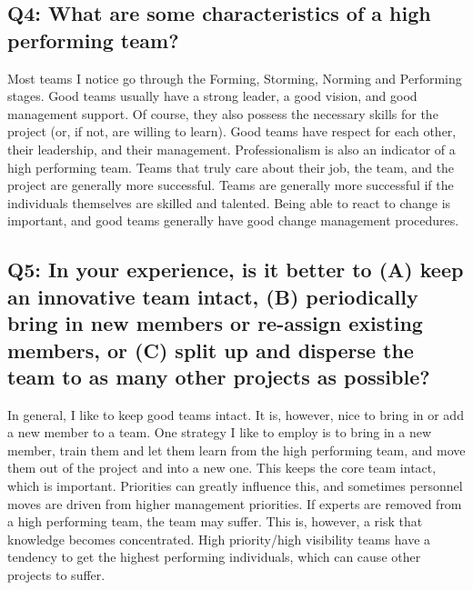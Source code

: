 \subsection*{Q4: What are some characteristics of a high performing team?}
Most teams I notice go through the Forming, Storming, Norming and Performing stages. Good teams usually have a strong leader, a good vision, and good management support. Of course, they also possess the necessary skills for the project (or, if not, are willing to learn). Good teams have respect for each other, their leadership, and their management. Professionalism is also an indicator of a high performing team. Teams that truly care about their job, the team, and the project are generally more successful. Teams are generally more successful if the individuals themselves are skilled and talented. Being able to react to change is important, and good teams generally have good change management procedures.

\subsection*{Q5: In your experience, is it better to (A) keep an innovative team intact, (B) periodically bring in new members or re-assign existing members, or (C) split up and disperse the team to as many other projects as possible?}
In general, I like to keep good teams intact. It is, however, nice to bring in or add a new member to a team. One strategy I like to employ is to bring in a new member, train them and let them learn from the high performing team, and move them out of the project and into a new one. This keeps the core team intact, which is important. Priorities can greatly influence this, and sometimes personnel moves are driven from higher management priorities. If experts are removed from a high performing team, the team may suffer. This is, however, a risk that knowledge becomes concentrated. High priority/high visibility teams have a tendency to get the highest performing individuals, which can cause other projects to suffer. 